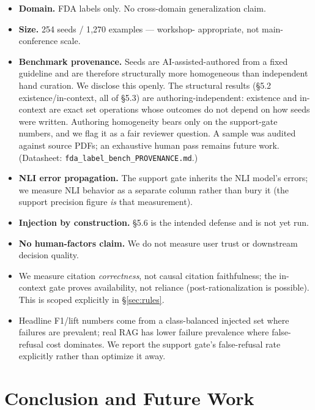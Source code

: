 \begin{itemize}
  \item \textbf{Domain.} FDA labels only. No cross-domain
    generalization claim.
  \item \textbf{Size.} 254 seeds / 1{,}270 examples --- workshop-%
    appropriate, not main-conference scale.
  \item \textbf{Benchmark provenance.} Seeds are AI-assisted-authored
    from a fixed guideline and are therefore structurally more
    homogeneous than independent hand curation. We disclose this
    openly. The structural results (\S5.2 existence/in-context, all of
    \S5.3) are authoring-independent: existence and in-context are
    exact set operations whose outcomes do not depend on how seeds
    were written. Authoring homogeneity bears only on the support-gate
    numbers, and we flag it as a fair reviewer question. A sample was
    audited against source PDFs; an exhaustive human pass remains
    future work. (Datasheet:
    \texttt{fda\_label\_bench\_PROVENANCE.md}.)
  \item \textbf{NLI error propagation.} The support gate inherits the
    NLI model's errors; we measure NLI behavior as a separate column
    rather than bury it (the support precision figure \emph{is} that
    measurement).
  \item \textbf{Injection by construction.} \S5.6 is the intended
    defense and is not yet run.
  \item \textbf{No human-factors claim.} We do not measure user trust
    or downstream decision quality.
  \item We measure citation \emph{correctness}, not causal citation
    faithfulness; the in-context gate proves availability, not
    reliance (post-rationalization is possible). This is scoped
    explicitly in \S\ref{sec:rules}.
  \item Headline F1/lift numbers come from a class-balanced injected
    set where failures are prevalent; real RAG has lower failure
    prevalence where false-refusal cost dominates. We report the
    support gate's false-refusal rate explicitly rather than optimize
    it away.
\end{itemize}

\section{Conclusion and Future Work}
\label{sec:conc}

